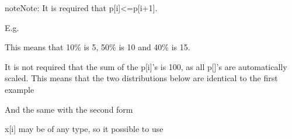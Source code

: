 \documentclass[letterpaper,10pt,english]{sphinxmanual}
\begin{document}
\begin{sphinxadmonition}{note}{Note:}
It is required that p{[}i{]}\textless{}=p{[}i+1{]}.
\end{sphinxadmonition}

E.g.

\begin{sphinxVerbatim}[commandchars=\\\{\}]
       
\end{sphinxVerbatim}

This means that 10\% is 5, 50\% is 10 and 40\% is 15.

It is not required that the sum of the p{[}i{]}’s is 100, as all p{[}{]}’s are automatically scaled. This means that the two distributions below are
identical to the first example

\begin{sphinxVerbatim}[commandchars=\\\{\}]
       
              
\end{sphinxVerbatim}

And the same with the second form

\begin{sphinxVerbatim}[commandchars=\\\{\}]
       
\end{sphinxVerbatim}

x{[}i{]} may be of any type, so it possible to use

\begin{sphinxVerbatim}[commandchars=\\\{\}]
     
\end{sphinxVerbatim}
\end{document}
